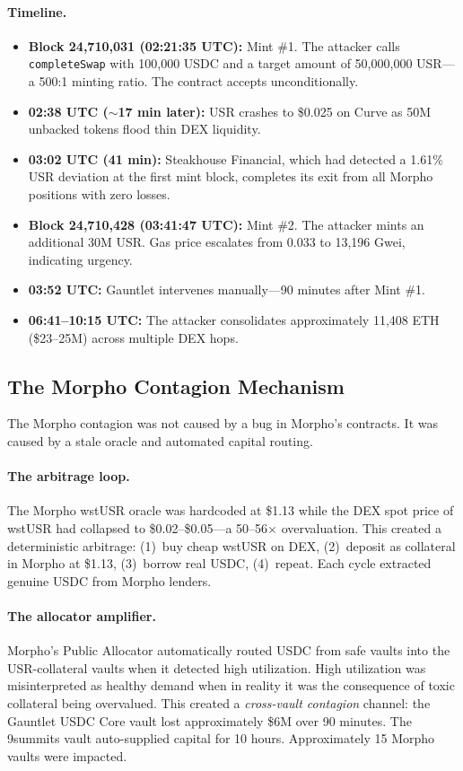 \documentclass[11pt]{article}
\begin{document}
\paragraph{Timeline.}
\begin{itemize}[leftmargin=*]
\item \textbf{Block 24,710,031 (02:21:35 UTC):} Mint \#1. The attacker calls \texttt{completeSwap} with 100,000 USDC and a target amount of 50,000,000 USR---a 500:1 minting ratio. The contract accepts unconditionally.
\item \textbf{02:38 UTC ($\sim$17 min later):} USR crashes to \$0.025 on Curve as 50M unbacked tokens flood thin DEX liquidity.
\item \textbf{03:02 UTC (41 min):} Steakhouse Financial, which had detected a 1.61\% USR deviation at the first mint block, completes its exit from all Morpho positions with zero losses.
\item \textbf{Block 24,710,428 (03:41:47 UTC):} Mint \#2. The attacker mints an additional 30M USR. Gas price escalates from 0.033 to 13,196 Gwei, indicating urgency.
\item \textbf{03:52 UTC:} Gauntlet intervenes manually---90 minutes after Mint \#1.
\item \textbf{06:41--10:15 UTC:} The attacker consolidates approximately 11,408 ETH (\$23--25M) across multiple DEX hops.
\end{itemize}

\subsection{The Morpho Contagion Mechanism}
\label{sec:resolv_contagion}

The Morpho contagion was not caused by a bug in Morpho's contracts. It was caused by a stale oracle and automated capital routing.

\paragraph{The arbitrage loop.} The Morpho wstUSR oracle was hardcoded at \$1.13 while the DEX spot price of wstUSR had collapsed to \$0.02--\$0.05---a 50--56$\times$ overvaluation. This created a deterministic arbitrage: (1)~buy cheap wstUSR on DEX, (2)~deposit as collateral in Morpho at \$1.13, (3)~borrow real USDC, (4)~repeat. Each cycle extracted genuine USDC from Morpho lenders.

\paragraph{The allocator amplifier.} Morpho's Public Allocator automatically routed USDC from safe vaults into the USR-collateral vaults when it detected high utilization. High utilization was misinterpreted as healthy demand when in reality it was the consequence of toxic collateral being overvalued. This created a \emph{cross-vault contagion} channel: the Gauntlet USDC Core vault lost approximately \$6M over 90 minutes. The 9summits vault auto-supplied capital for 10 hours. Approximately 15 Morpho vaults were impacted.
\end{document}
